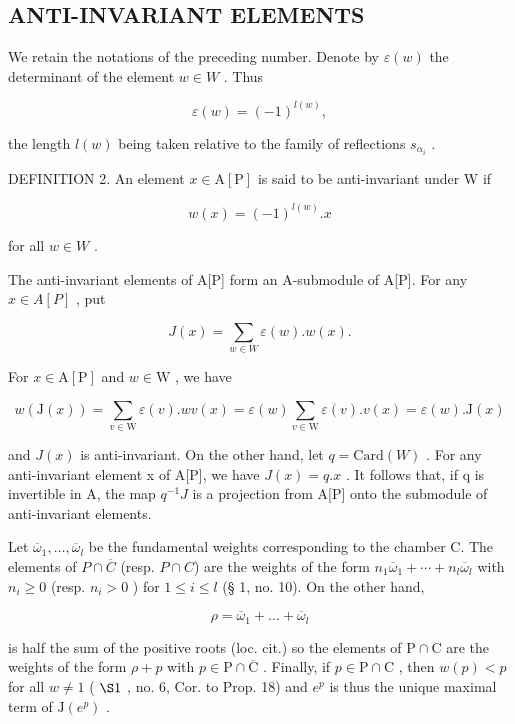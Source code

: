 \subsection{ANTI-INVARIANT ELEMENTS}

We retain the notations of the preceding number. Denote by \(\varepsilon(w)\) the determinant of the element \(w \in W\) . Thus

\[
\varepsilon (w) = (- 1) ^ {l (w)},
\]

the length \(l(w)\) being taken relative to the family of reflections \(s_{\alpha_i}\) .

DEFINITION 2. An element \(x \in \mathrm{A}[\mathrm{P}]\) is said to be anti-invariant under W if

\[
w (x) = (- 1) ^ {l (w)}. x
\]

for all \(w \in W\) .

The anti-invariant elements of A{[}P{]} form an A-submodule of A{[}P{]}. For any \(x \in A[P]\) , put

\[
J (x) = \sum_ {w \in W} \varepsilon (w). w (x).\tag{1}
\]

For \(x \in \mathrm{A}[\mathrm{P}]\) and \(w \in \mathrm{W}\) , we have

\[
w (\mathrm{J} (x)) = \sum_ {v \in \mathrm{W}} \varepsilon (v). w v (x) = \varepsilon (w) \sum_ {v \in \mathrm{W}} \varepsilon (v). v (x) = \varepsilon (w). \mathrm{J} (x)
\]

and \(J(x)\) is anti-invariant. On the other hand, let \(q = \text{Card}(W)\) . For any anti-invariant element x of A{[}P{]}, we have \(J(x) = q.x\) . It follows that, if q is invertible in A, the map \(q^{-1}J\) is a projection from A{[}P{]} onto the submodule of anti-invariant elements.

Let \(\overline{\omega}_{1},\ldots,\overline{\omega}_{l}\) be the fundamental weights corresponding to the chamber C. The elements of \(P\cap\overline{C}\) (resp. \(P\cap C\)) are the weights of the form \(n_{1}\overline{\omega}_{1}+\cdots+n_{l}\overline{\omega}_{l}\) with \(n_{i}\geqslant0\) (resp. \(n_{i}>0\) ) for \(1\leqslant i\leqslant l\) (§ 1, no. 10). On the other hand,

\[
\rho = \overline {{\omega}} _ {1} + \dots + \overline {{\omega}} _ {l}
\]

is half the sum of the positive roots (loc. cit.) so the elements of \(\mathrm{P} \cap \mathrm{C}\) are the weights of the form \(\rho + p\) with \(p \in \mathrm{P} \cap \overline{\mathrm{C}}\) . Finally, if \(p \in \mathrm{P} \cap \mathrm{C}\) , then \(w(p) < p\) for all \(w \neq 1\) ( \(\S 1\) , no. 6, Cor. to Prop. 18) and \(e^p\) is thus the unique maximal term of \(\mathrm{J}(e^p)\) .

